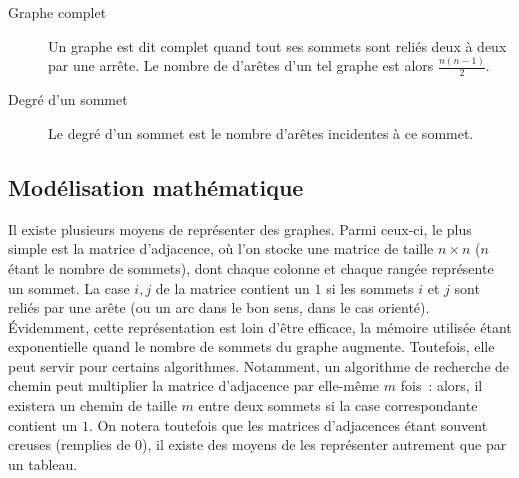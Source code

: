 \begin{description}
\begin{center}
      \end{center}
    \item[Graphe complet] Un graphe est dit complet quand tout ses sommets sont
      reliés deux à deux par une arrête. Le nombre de d'arêtes d'un tel graphe
      est alors $\frac {n(n-1)} 2$.
      \begin{center}
      \end{center}
    \item[Degré d'un sommet] Le degré d'un sommet est le nombre d'arêtes
      incidentes à ce sommet.
  \end{description}

\subsection{Modélisation mathématique}
Il existe plusieurs moyens de représenter des graphes. Parmi ceux-ci,
le plus simple est la matrice d'adjacence, où l'on stocke une matrice
de taille $n\times n$ ($n$ étant le nombre de sommets), dont chaque
colonne et chaque rangée représente un sommet. La case $i, j$ de la
matrice contient un $1$ si les sommets $i$ et $j$ sont reliés par une
arête (ou un arc dans le bon sens, dans le cas orienté). Évidemment,
cette représentation est loin d'être efficace, la mémoire utilisée
étant exponentielle quand le nombre de sommets du graphe
augmente. Toutefois, elle peut servir pour certains
algorithmes. Notamment, un algorithme de recherche de chemin peut
multiplier la matrice d'adjacence par elle-même $m$ fois~: alors, il
existera un chemin de taille $m$ entre deux sommets si la case
correspondante contient un $1$.
  On notera toutefois que les matrices d'adjacences étant souvent creuses
  (remplies de 0), il existe des moyens de les représenter autrement que
  par un tableau.

